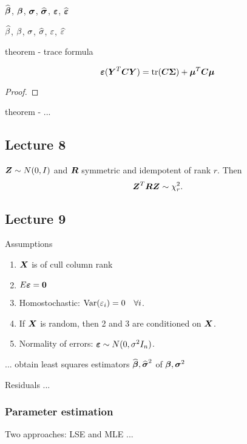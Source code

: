 



$\Bh$, $\B$, $\S$, $\Sh$, $\E$, $\Eh$

$\bh$, $\b$, $\s$, $\sh$, $\e$, $\eh$


theorem - trace formula 
\begin{theorem} 
    $$
        \E(\Y^T\bs{C}\Y) = \mr{tr}(\bs{C\Sigma}) + \M^T\bs{C}\M
    $$    
\end{theorem}
\begin{proof}
    \TODO{}
\end{proof}

theorem - ...


\subsection*{Lecture 8}

\begin{theorem}
    $\bs{Z}\sim N(0, I)$ and $\bs{R}$ symmetric and idempotent of rank $r$. Then 
    $$
        \bs{Z}^T \bs{R} \bs{Z} \sim \chi^2_r.
    $$
\end{theorem}


\subsection*{Lecture 9}

Assumptions
\begin{enumerate}
    \item $\X$ is of cull column rank
    \item $E\E=\boldsymbol{0}$
    \item Homostochastic: $\var(\e_i) = 0 \quad\forall i$.
    \item If $\X$ is random, then 2 and 3 are conditioned on $\X$. 
    \item Normality of errors: $\E\sim N(0, \s^2I_n)$.
\end{enumerate}

... obtain least squares estimators $\Bh, \Sh^2$ of $\B, \S^2$

Residuals ...

\subsubsection*{Parameter estimation}

Two approaches: LSE and MLE ...

